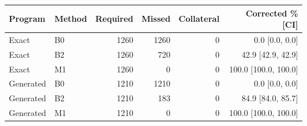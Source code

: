\begin{tabular}{llrrrr}
\toprule
Program & Method & Required & Missed & Collateral & Corrected \% [CI] \\
\midrule
Exact & B0 & 1260 & 1260 & 0 & 0.0 [0.0, 0.0] \\
Exact & B2 & 1260 & 720 & 0 & 42.9 [42.9, 42.9] \\
Exact & M1 & 1260 & 0 & 0 & 100.0 [100.0, 100.0] \\
Generated & B0 & 1210 & 1210 & 0 & 0.0 [0.0, 0.0] \\
Generated & B2 & 1210 & 183 & 0 & 84.9 [84.0, 85.7] \\
Generated & M1 & 1210 & 0 & 0 & 100.0 [100.0, 100.0] \\
\bottomrule
\end{tabular}
